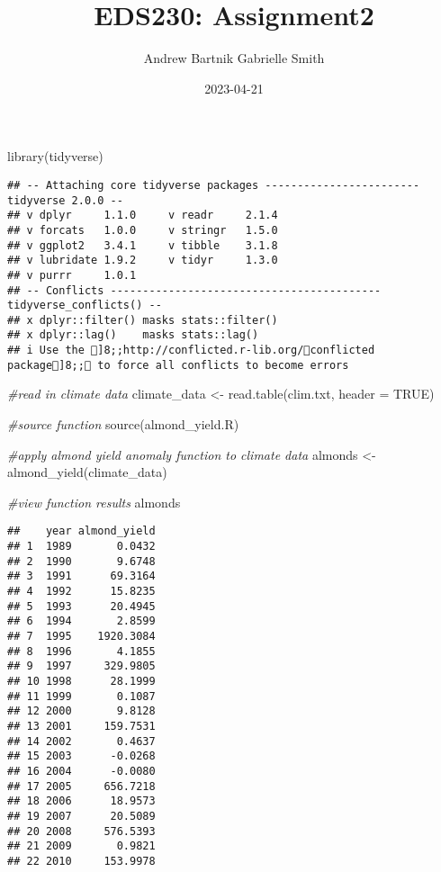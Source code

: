 \documentclass[
]{article}
\title{EDS230: Assignment2}
\author{Andrew Bartnik Gabrielle Smith}
\date{2023-04-21}
\newenvironment{Shaded}{\begin{snugshade}}{\end{snugshade}}
\newcommand{\AttributeTok}[1]{\textcolor[rgb]{0.77,0.63,0.00}{#1}}
\newcommand{\CommentTok}[1]{\textcolor[rgb]{0.56,0.35,0.01}{\textit{#1}}}
\newcommand{\ConstantTok}[1]{\textcolor[rgb]{0.00,0.00,0.00}{#1}}
\newcommand{\FunctionTok}[1]{\textcolor[rgb]{0.00,0.00,0.00}{#1}}
\newcommand{\NormalTok}[1]{#1}
\newcommand{\OtherTok}[1]{\textcolor[rgb]{0.56,0.35,0.01}{#1}}
\newcommand{\StringTok}[1]{\textcolor[rgb]{0.31,0.60,0.02}{#1}}
\begin{document}
\maketitle

\begin{Shaded}
\begin{Highlighting}[]
\FunctionTok{library}\NormalTok{(tidyverse)}
\end{Highlighting}
\end{Shaded}

\begin{verbatim}
## -- Attaching core tidyverse packages ------------------------ tidyverse 2.0.0 --
## v dplyr     1.1.0     v readr     2.1.4
## v forcats   1.0.0     v stringr   1.5.0
## v ggplot2   3.4.1     v tibble    3.1.8
## v lubridate 1.9.2     v tidyr     1.3.0
## v purrr     1.0.1     
## -- Conflicts ------------------------------------------ tidyverse_conflicts() --
## x dplyr::filter() masks stats::filter()
## x dplyr::lag()    masks stats::lag()
## i Use the ]8;;http://conflicted.r-lib.org/conflicted package]8;; to force all conflicts to become errors
\end{verbatim}

\begin{Shaded}
\begin{Highlighting}[]
\CommentTok{\#read in climate data}
\NormalTok{climate\_data }\OtherTok{\textless{}{-}} \FunctionTok{read.table}\NormalTok{(}\StringTok{\textquotesingle{}clim.txt\textquotesingle{}}\NormalTok{, }\AttributeTok{header =} \ConstantTok{TRUE}\NormalTok{)}

\CommentTok{\#source function}
\FunctionTok{source}\NormalTok{(}\StringTok{\textquotesingle{}almond\_yield.R\textquotesingle{}}\NormalTok{)}

\CommentTok{\#apply almond yield anomaly function to climate data}
\NormalTok{almonds }\OtherTok{\textless{}{-}} \FunctionTok{almond\_yield}\NormalTok{(climate\_data)}

\CommentTok{\#view function results}
\NormalTok{almonds}
\end{Highlighting}
\end{Shaded}

\begin{verbatim}
##    year almond_yield
## 1  1989       0.0432
## 2  1990       9.6748
## 3  1991      69.3164
## 4  1992      15.8235
## 5  1993      20.4945
## 6  1994       2.8599
## 7  1995    1920.3084
## 8  1996       4.1855
## 9  1997     329.9805
## 10 1998      28.1999
## 11 1999       0.1087
## 12 2000       9.8128
## 13 2001     159.7531
## 14 2002       0.4637
## 15 2003      -0.0268
## 16 2004      -0.0080
## 17 2005     656.7218
## 18 2006      18.9573
## 19 2007      20.5089
## 20 2008     576.5393
## 21 2009       0.9821
## 22 2010     153.9978
\end{verbatim}
\end{document}
